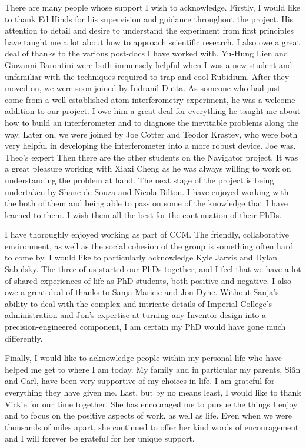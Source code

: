\begin{acknowledgements}
\noindent
There are many people whose support I wish to acknowledge. Firstly, I would like to thank Ed Hinds for his
supervision and guidance throughout the project. His attention to
detail and desire to understand the experiment from first principles
have taught me a lot about how to approach scientific research. I also
owe a great deal of thanks to the various post-docs I have worked
with. Yu-Hung Lien and Giovanni Barontini were both immensely helpful when I was a new student
and unfamiliar with the techniques required to trap and cool Rubidium. After they moved on, we were soon joined by Indranil
Dutta. As someone who had just come from a well-established
atom interferometry experiment, he was a welcome addition
to our project. I owe him a great deal for everything he taught me
about how to build an interferometer and to diagnose the inevitable
problems along the way. Later on, we were joined by Joe Cotter and
Teodor Krastev, who were both very helpful in developing the
interferometer into a more robust device. Joe was. Theo's expert
Then there are the other students on the Navigator project. It was a
great pleasure working with Xiaxi Cheng as he was always willing to
work on understanding the problem at hand. The next stage of the
project is being undertaken by Shane de Souza and Nicola Bilton. I
have enjoyed working with the both of them and being able to pass on
some of the knowledge that I have learned to them. I wish them all the
best for the continuation of their PhDs. 
\par\noindent 
I have thoroughly enjoyed working as part of CCM. The friendly,
collaborative environment, as well as the social cohesion of the group
is something often hard to come by. I would like to particularly
acknowledge Kyle Jarvis and Dylan Sabulsky. The three of us started
our PhDs together, and I feel that we have a lot of shared experiences
of life as PhD students, both positive and negative. I also owe a
great deal of thanks to Sanja Maricic and Jon Dyne. Without Sanja's
ability to deal with the complex and intricate details of Imperial
College's administration and Jon's expertise at turning
any Inventor design into a precision-engineered component, I am
certain my PhD would have gone much differently.
\par\noindent
Finally, I would like to acknowledge people within my personal life
who have helped me get to where I am today. My family and in
particular my parents, Si\^{a}n and
Carl, have been very supportive of my choices in life. I am grateful
for everything they have given me. Last, but by no means least, I would
like to thank Vickie for our time together. She has encouraged me to pursue the things I
enjoy and to focus on the positive aspects of work, as well as life. Even when we were thousands of miles apart, she continued to
offer her kind words of encouragement and I will forever be grateful
for her unique support.
\end{acknowledgements}
\tableofcontents
\listoffigures
\listoftables
{}
\let\clearpage\relax

